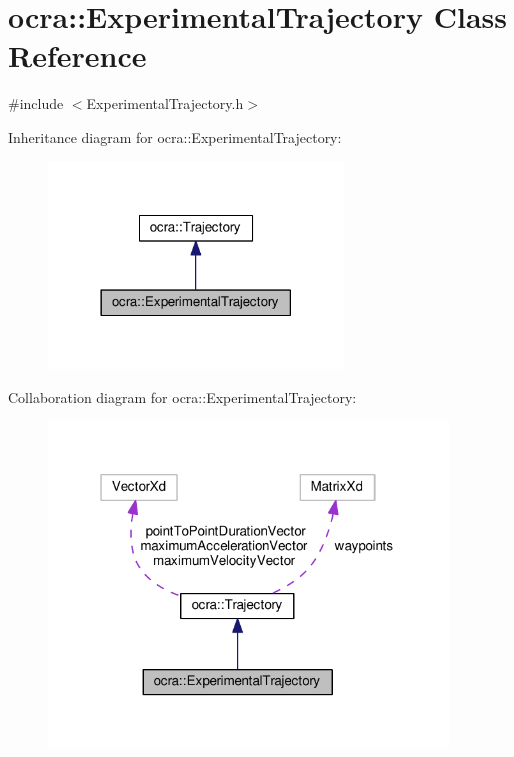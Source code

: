 \hypertarget{classocra_1_1ExperimentalTrajectory}{}\section{ocra\+:\+:Experimental\+Trajectory Class Reference}
\label{classocra_1_1ExperimentalTrajectory}


{\ttfamily \#include $<$Experimental\+Trajectory.\+h$>$}



Inheritance diagram for ocra\+:\+:Experimental\+Trajectory\+:
\nopagebreak
\begin{figure}[H]
\begin{center}
\leavevmode
\includegraphics[width=222pt]{da/dcb/classocra_1_1ExperimentalTrajectory__inherit__graph}
\end{center}
\end{figure}


Collaboration diagram for ocra\+:\+:Experimental\+Trajectory\+:
\nopagebreak
\begin{figure}[H]
\begin{center}
\leavevmode
\includegraphics[width=301pt]{d6/d6c/classocra_1_1ExperimentalTrajectory__coll__graph}
\end{center}
\end{figure}

